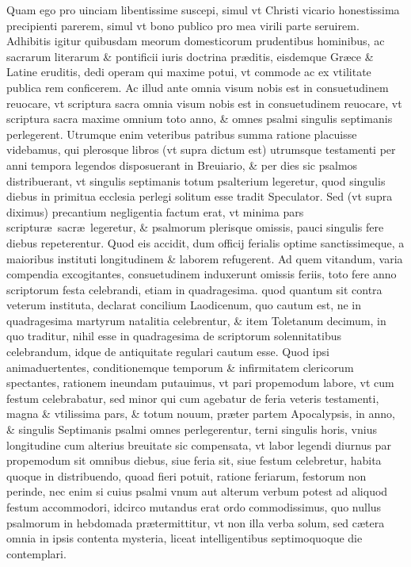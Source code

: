 \documentclass[a5paper,10pt]{book}
\def\ae{æ}
\begin{document}
Quam ego pro uinciam libentissime suscepi, simul vt Christi vicario honestissima precipienti parerem, simul vt bono publico pro mea virili parte seruirem.
Adhibitis igitur quibusdam meorum domesticorum prudentibus hominibus, ac sacrarum literarum \& pontificii iuris doctrina pr\ae ditis, eisdemque Gr\ae ce \& Latine eruditis, dedi operam qui maxime potui, vt commode ac ex vtilitate publica rem conficerem.
Ac illud ante omnia visum nobis est in consuetudinem reuocare, vt scriptura sacra omnia visum nobis est in consuetudinem reuocare, vt scriptura sacra maxime omnium toto anno, \& omnes %
psalmi singulis septimanis perlegerent.
Utrumque enim veteribus patribus summa ratione placuisse videbamus, qui plerosque libros (vt supra dictum est) utrumsque testamenti per anni tempora legendos disposuerant in Breuiario, \& per dies sic psalmos distribuerant, vt singulis septimanis
totum psalterium legeretur, quod singulis diebus in primitua ecclesia perlegi solitum esse tradit Speculator.
Sed (vt supra diximus) precantium negligentia factum erat, vt minima pars scriptur\ae \ sacr\ae \ legeretur, \& psalmorum plerisque omissis, pauci singulis fere diebus repeterentur.
Quod eis accidit, dum officij ferialis optime sanctissimeque, a maioribus instituti longitudinem \& laborem refugerent.
Ad quem vitandum, varia compendia excogitantes, consuetudinem induxerunt omissis feriis, toto fere anno scriptorum %
festa celebrandi, etiam in quadragesima.
quod %
quantum sit contra veterum instituta, declarat concilium Laodicenum, quo cautum est, ne in quadragesima martyrum natalitia celebrentur, \& item Toletanum decimum, in quo traditur, nihil esse in quadragesima de scriptorum %
solennitatibus %
celebrandum, idque de antiquitate regulari cautum esse.
Quod ipsi animaduertentes, conditionemque temporum \& infirmitatem clericorum spectantes, rationem ineundam putauimus, vt pari propemodum labore, vt cum festum celebrabatur, sed minor qui cum agebatur de feria veteris testamenti, magna \& vtilissima pars, \& totum nouum, pr\ae ter partem Apocalypsis, in anno, \& singulis Septimanis psalmi omnes perlegerentur, terni singulis horis, vnius longitudine cum alterius breuitate sic compensata, vt labor legendi diurnus par propemodum sit omnibus diebus, siue feria sit, siue festum celebretur, habita quoque in distribuendo, quoad fieri potuit, ratione feriarum, festorum non perinde, nec enim si cuius psalmi vnum aut alterum verbum potest ad aliquod festum accommodori, idcirco mutandus erat ordo commodissimus, quo nullus psalmorum in hebdomada pr\ae termittitur, vt non illa verba solum, sed c\ae tera omnia in ipsis contenta mysteria, liceat intelligentibus septimoquoque die contemplari.
\end{document}
